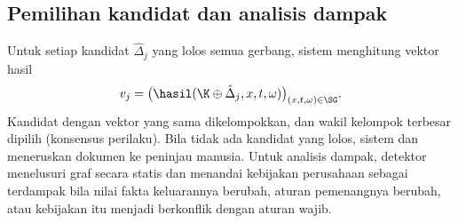 \subsection{Pemilihan kandidat dan analisis dampak}
Untuk setiap kandidat $\hat{\Delta}_j$ yang lolos semua gerbang, sistem menghitung vektor hasil
\begin{equation}
v_j = \big(\hasil(\K \oplus \hat{\Delta}_j, x, t, \omega)\big)_{(x,t,\omega) \in \SG}.
\label{eq:vektor}
\end{equation}
Kandidat dengan vektor yang sama dikelompokkan, dan wakil kelompok terbesar dipilih (konsensus perilaku). Bila tidak ada kandidat yang lolos, sistem  dan meneruskan dokumen ke peninjau manusia. Untuk analisis dampak, detektor menelusuri graf secara statis dan menandai kebijakan perusahaan sebagai terdampak bila nilai fakta keluarannya berubah, aturan pemenangnya berubah, atau kebijakan itu menjadi berkonflik dengan aturan wajib.
